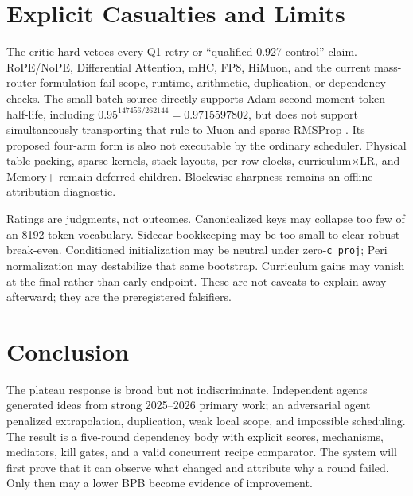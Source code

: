 \documentclass{article}
\begin{document}
\section{Explicit Casualties and Limits}

The critic hard-vetoes every Q1 retry or ``qualified 0.927 control'' claim.
RoPE/NoPE, Differential Attention, mHC, FP8, HiMuon, and the current
mass-router formulation fail scope, runtime, arithmetic, duplication, or
dependency checks.  The small-batch source directly supports Adam
second-moment token half-life, including
$0.95^{147456/262144}=0.9715597802$, but does not support simultaneously
transporting that rule to Muon and sparse RMSProp \cite{marek2025smallbatch}.
Its proposed four-arm form is also not executable by the ordinary scheduler.
Physical table packing, sparse kernels, stack layouts, per-row clocks,
curriculum$\times$LR, and Memory+ remain deferred children.  Blockwise
sharpness remains an offline attribution diagnostic.

Ratings are judgments, not outcomes.  Canonicalized keys may collapse too few
of an 8192-token vocabulary.  Sidecar bookkeeping may be too small to clear
robust break-even.  Conditioned initialization may be neutral under
zero-\texttt{c\_proj}; Peri normalization may destabilize that same bootstrap.
Curriculum gains may vanish at the final rather than early endpoint.  These
are not caveats to explain away afterward; they are the preregistered
falsifiers.

\section{Conclusion}

The plateau response is broad but not indiscriminate.  Independent agents
generated ideas from strong 2025--2026 primary work; an adversarial agent
penalized extrapolation, duplication, weak local scope, and impossible
scheduling.  The result is a five-round dependency body with explicit scores,
mechanisms, mediators, kill gates, and a valid concurrent recipe comparator.
The system will first prove that it can observe what changed and attribute
why a round failed.  Only then may a lower BPB become evidence of improvement.
\end{document}
